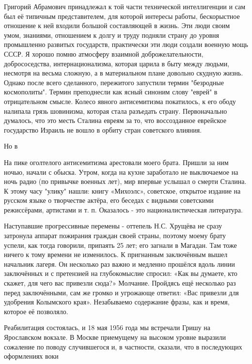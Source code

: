 Григорий Абрамович принадлежал к той части технической интеллигенции и сам был её типичным представителем, для которой интересы работы, бескорыстное отношение к ней входили большой составляющей в жизнь. Эти люди своим умом, знаниями, отношением к долгу и труду подняли страну до уровня промышленно развитых государств, практически эти люди создали военную мощь СССР. Я хорошо помню атмосферу взаимной доброжелательности, добрососедства, интернационализма, которая царила в быту между людьми, несмотря на весьма сложную, а в материальном плане довольно скудную жизнь. Однако после всего сделанного, пережитого запустили термин "безродные космополиты". Термин преподнесли как ясный синоним слову "еврей" в отрицательном смысле. Колесо явного антисемитизма покатилось, к его ободу налипала грязь шовинизма, которая стала разъедать страну. Первоначально думалось, что это месть Сталина евреям за то, что воссозданное еврейское государство Израиль не вошло в орбиту стран советского влияния.

Но в

На пике оголтелого антисемитизма арестовали моего брата. Пришли за ним ночью, начали с обыска. Утром, когда на кухне заработало не выключаемое на ночь радио (по привычке военных лет), мир впервые услышал о смерти Сталина. К этому часу "улику" нашли: книгу «Михоэлс», советское, открытое издание на русском языке о творчестве актёра, его беседах с видными советскими режиссёрами, артистами и т. п. Оказалось - это националистическая литература.

Наступавшие прогрессивные перемены - оттепель Н.С. Хрущёва не сразу затронула аппарат пожирания граждан своей страны, поэтому моему брату успели, как тогда говорили, припаять 25 лет; его загнали в Магадан. Там тоже ничего к тому времени не изменилось. К пригнанным заключённым вышел начальник лагеря. Он несколько раз важно и медленно прошёлся вдоль линии заключённых и с претензией на глубокомыслие спросил: «Как вы думаете, кто скажет, для чего вас привезли сюда?» Молчание. Пройдясь ещё несколько раз перед заключёнными, сам же громко и угрожающе ответил: «Вас привезли для удобрения Колымского края». Незабываемо содержание фразы, как и время, которое её позволяло.

Реабилитация состоялась, и 18 мая 1956 года мы встречали Гришу на Ярославском вокзале. В Москве приемущему на высоком уровне выразили сожаление по поводу случившегося и, в частности, сказали, что в последующих оформлениях воки


